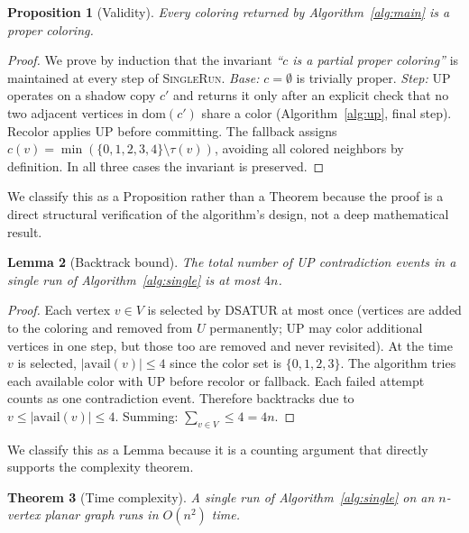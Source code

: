 \documentclass[11pt,twocolumn]{article}
\newtheorem{theorem}{Theorem}[section]
\newtheorem{lemma}[theorem]{Lemma}
\newtheorem{proposition}[theorem]{Proposition}
\begin{document}
\begin{proposition}[Validity]
\label{prop:valid}
Every coloring returned by Algorithm~\ref{alg:main} is a proper coloring.
\end{proposition}

\begin{proof}
We prove by induction that the invariant \emph{``$c$ is a partial proper
coloring''} is maintained at every step of \textsc{SingleRun}.
\emph{Base:} $c=\emptyset$ is trivially proper.
\emph{Step:} UP operates on a shadow copy $c'$ and returns it only after
an explicit check that no two adjacent vertices in $\mathrm{dom}(c')$
share a color (Algorithm~\ref{alg:up}, final step).  Recolor applies UP
before committing.  The fallback assigns
$c(v)=\min(\{0,1,2,3,4\}\setminus\tau(v))$, avoiding all colored
neighbors by definition.  In all three cases the invariant is preserved.
\end{proof}

We classify this as a Proposition rather than a Theorem because the proof
is a direct structural verification of the algorithm's design, not a deep
mathematical result.

\begin{lemma}[Backtrack bound]
\label{lem:bt}
The total number of UP contradiction events in a single run of
Algorithm~\ref{alg:single} is at most $4n$.
\end{lemma}

\begin{proof}
Each vertex $v\in V$ is selected by DSATUR at most once (vertices are
added to the coloring and removed from $U$ permanently; UP may color
additional vertices in one step, but those too are removed and never
revisited).  At the time $v$ is selected, $|\mathrm{avail}(v)|\leq 4$
since the color set is $\{0,1,2,3\}$.  The algorithm tries each available
color with UP before recolor or fallback.  Each failed attempt counts as
one contradiction event.  Therefore backtracks due to $v\leq |\mathrm{avail}(v)|\leq 4$.
Summing: $\sum_{v\in V}\leq 4 = 4n$.
\end{proof}

We classify this as a Lemma because it is a counting argument that
directly supports the complexity theorem.

\begin{theorem}[Time complexity]
\label{thm:time}
A single run of Algorithm~\ref{alg:single} on an $n$-vertex planar graph
runs in $O(n^2)$ time.
\end{theorem}
\end{document}

